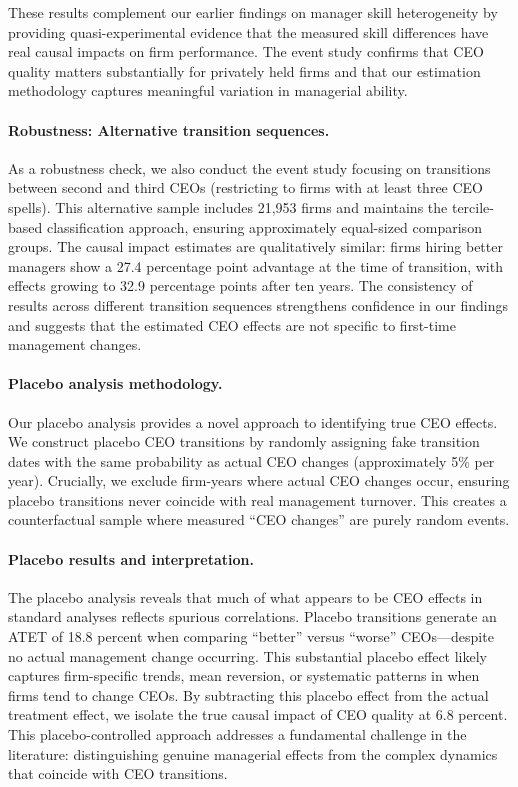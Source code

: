 \documentclass[11pt,a4paper]{article}
\begin{document}
These results complement our earlier findings on manager skill heterogeneity by providing quasi-experimental evidence that the measured skill differences have real causal impacts on firm performance. The event study confirms that CEO quality matters substantially for privately held firms and that our estimation methodology captures meaningful variation in managerial ability.

\paragraph{Robustness: Alternative transition sequences.} As a robustness check, we also conduct the event study focusing on transitions between second and third CEOs (restricting to firms with at least three CEO spells). This alternative sample includes 21,953 firms and maintains the tercile-based classification approach, ensuring approximately equal-sized comparison groups. The causal impact estimates are qualitatively similar: firms hiring better managers show a 27.4 percentage point advantage at the time of transition, with effects growing to 32.9 percentage points after ten years. The consistency of results across different transition sequences strengthens confidence in our findings and suggests that the estimated CEO effects are not specific to first-time management changes.

\paragraph{Placebo analysis methodology.} Our placebo analysis provides a novel approach to identifying true CEO effects. We construct placebo CEO transitions by randomly assigning fake transition dates with the same probability as actual CEO changes (approximately 5\% per year). Crucially, we exclude firm-years where actual CEO changes occur, ensuring placebo transitions never coincide with real management turnover. This creates a counterfactual sample where measured ``CEO changes'' are purely random events.

\paragraph{Placebo results and interpretation.} The placebo analysis reveals that much of what appears to be CEO effects in standard analyses reflects spurious correlations. Placebo transitions generate an ATET of 18.8 percent when comparing ``better'' versus ``worse'' CEOs---despite no actual management change occurring. This substantial placebo effect likely captures firm-specific trends, mean reversion, or systematic patterns in when firms tend to change CEOs. By subtracting this placebo effect from the actual treatment effect, we isolate the true causal impact of CEO quality at 6.8 percent. This placebo-controlled approach addresses a fundamental challenge in the literature: distinguishing genuine managerial effects from the complex dynamics that coincide with CEO transitions. 
\end{document}
